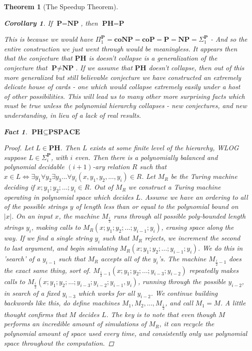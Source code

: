 \documentclass{article}
\theoremstyle{definition}
\theoremstyle{plain}
\theoremstyle{theorem}
\newtheorem{fact}{Fact}[section]
\newtheorem{theorem}{Theorem}[section]
\newtheorem{corollary}{Corollary}[section]
\begin{document}
\begin{theorem}[The Speedup Theorem]
\begin{corollary}
    If $\textbf{P} = \textbf{NP}$, then $\textbf{PH} = \textbf{P}$
\end{corollary}
This is because we would have $\Pi_1^{\textbf{P}} = \textbf{coNP} = \textbf{coP} = \textbf{P} = \textbf{NP} = \Sigma_1^{\textbf{P}}$ - And so the entire construction we just went through would be meaningless. It appears then that the conjecture that $\textbf{PH}$ is doesn't collapse is a generalization of the conjecture that $\textbf{P} \neq \textbf{NP}$. If we assume that $\textbf{PH}$ doesn't collapse, then out of this more generalized but still believable conjecture we have constructed an extremely delicate house of cards - one which would collapse extremely easily under a host of other possibilities. This will lead us to many other more surprising facts which must be true unless the polynomial hierarchy collapses - new conjectures, and new understanding, in lieu of a lack of real results.
\begin{fact}
    $\textbf{PH} \subseteq \textbf{PSPACE}$
\end{fact}
\begin{proof}
    Let $L \in \textbf{PH}$. Then $L$ exists at some finite level of the hierarchy, WLOG suppose $L \in \Sigma_i^{\textbf{P}}$, with $i$ even. Then there is a polynomially balanced and polynomial decidable $(i+1)$-ary  relation $R$ such that $x \in L \iff \exists y_1 \forall y_2 \exists y_3 ... \forall y_i (x,y_1,y_2,...,y_i) \in R$. Let $M_R$ be the Turing machine deciding if $x;y_1;y_2;...;y_i \in R$. Out of $M_R$ we construct a Turing machine operating in polynomial space which decides $L$. Assume we have an ordering to all of the possible strings $y$ of length less than or equal to the polynomial bound on $|x|$. On an input $x$, the machine $M_{\frac{i}{2}}$ runs through all possible poly-bounded length strings $y_i$, making calls to $M_R(x;y_1;y_2;...;y_{i-1};y_i)$, erasing space along the way. If we find a single string $y_i$ such that $M_R$ rejects, we increment the second to last argument, and begin simulating $M_R(x;y_1;y_2;...;y_{i-1};y_i)$. We do this in 'search' of a $y_{i-1}$ such that $M_R$ accepts all of the $y_i$'s. The machine $M_{\frac{i}{2}-1}$ does the exact same thing, sort of. $M_{\frac{i}{2}-1}(x;y_1;y_2;...;y_{i-3};y_{i-2})$ repeatedly makes calls to $M_{\frac{i}{2}}(x;y_1;y_2;...;y_{i-3};y_{i-2};y_{i-1},y_i)$, running through the possible $y_{i-2}$, in search of a fixed $y_{i-3}$ which works for all $y_{i-2}$. We continue building backwords like this, do define machines $M_1, M_2,...,M_{\frac{i}{2}}$, and call $M_1 = M$. A little thought confirms that $M$ decides $L$. The key is to note that even though $M$ performs an incredible amount of simulations of $M_R$, it can recycle the polynomial amount of space used every time, and consistently only use polynomial space throughout the computation.
\end{proof}

\end{theorem}
\end{document}
